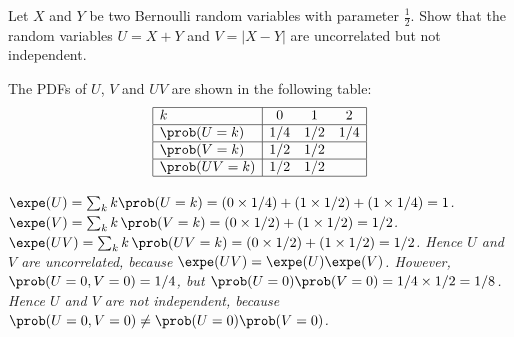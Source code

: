 \begin{example}
Let $X$ and $Y$ be two Bernoulli random variables with parameter $\frac{1}{2}$. Show that the random variables $U=X+Y$ and $V=|X-Y|$ are uncorrelated but not independent.
\end{example}

\begin{solution}
The PDFs of $U$, $V$ and $UV$ are shown in the following table:
\[
\begin{array}{|l|ccc|}\hline
k				& 0		& 1		& 2	\\ \hline
\prob(U=k)		& 1/4	& 1/2	& 1/4	\\ \hline
\prob(V=k)		& 1/2	& 1/2	& \\ \hline
\prob(UV=k) 		& 1/2	& 1/2	& \\ \hline
\end{array}
\]

%
\bit
\it $\expe(U) = \sum_k k\prob(U=k) = \left(0\times 1/4\right) + \left(1\times 1/2\right) + \left(1\times 1/4\right) = 1$.
\it $\expe(V) = \sum_k k\,\prob(V=k) = \left(0\times 1/2\right) + \left(1\times 1/2\right) = 1/2$.
\it $\expe(UV) = \sum_k k\,\prob(UV=k) = \left(0\times 1/2\right) + \left(1\times 1/2\right) = 1/2$.
\eit
Hence $U$ and $V$ are uncorrelated, because $\expe(UV)=\expe(U)\expe(V)$. However, 
\bit
\it $\prob(U=0,V=0) = 1/4$, but 
\it $\prob(U=0)\prob(V=0) = 1/4 \times 1/2 = 1/8$.
\eit
Hence $U$ and $V$ are not independent, because $\prob(U=0,V=0)\neq\prob(U=0)\prob(V=0)$.
\end{solution}

